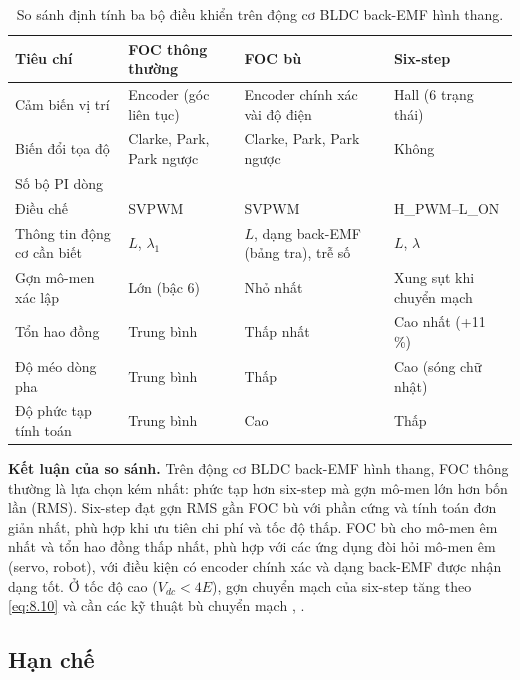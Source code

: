 \begin{table}[H]
\centering\small
\caption{So sánh định tính ba bộ điều khiển trên động cơ BLDC back-EMF hình thang.}\label{tab:8.4}
\begin{tabularx}{\linewidth}{@{}>{\raggedright\arraybackslash}X>{\raggedright\arraybackslash}X>{\raggedright\arraybackslash}X>{\raggedright\arraybackslash}X@{}}
\toprule
Tiêu chí & FOC thông thường & FOC bù & Six-step \\ \midrule
Cảm biến vị trí & Encoder (góc liên tục) & Encoder chính xác vài độ điện & 3 Hall (6 trạng thái) \\
Biến đổi tọa độ & Clarke, Park, Park ngược & Clarke, Park, Park ngược & Không \\
Số bộ PI dòng & 2 & 2 & 1 \\
Điều chế & SVPWM & SVPWM & H\_PWM–L\_ON \\
Thông tin động cơ cần biết & $L$, $\lambda_1$ & $L$, dạng back-EMF (bảng tra), trễ số & $L$, $\lambda$ \\
Gợn mô-men xác lập & Lớn (bậc 6) & Nhỏ nhất & Xung sụt khi chuyển mạch \\
Tổn hao đồng & Trung bình & Thấp nhất & Cao nhất (+11 \%) \\
Độ méo dòng pha & Trung bình & Thấp & Cao (sóng chữ nhật) \\
Độ phức tạp tính toán & Trung bình & Cao & Thấp \\
\bottomrule
\end{tabularx}
\end{table}

\textbf{Kết luận của so sánh.} Trên động cơ BLDC back-EMF hình thang, FOC thông thường là lựa chọn kém nhất: phức tạp hơn six-step mà gợn mô-men lớn hơn bốn lần (RMS). Six-step đạt gợn RMS gần FOC bù với phần cứng và tính toán đơn giản nhất, phù hợp khi ưu tiên chi phí và tốc độ thấp. FOC bù cho mô-men êm nhất và tổn hao đồng thấp nhất, phù hợp với các ứng dụng đòi hỏi mô-men êm (servo, robot), với điều kiện có encoder chính xác và dạng back-EMF được nhận dạng tốt. Ở tốc độ cao ($V_{dc} < 4E$), gợn chuyển mạch của six-step tăng theo \eqref{eq:8.10} và cần các kỹ thuật bù chuyển mạch \cite{r1}, \cite{r3}.

\subsection{Hạn chế}\label{sec:8.8}

